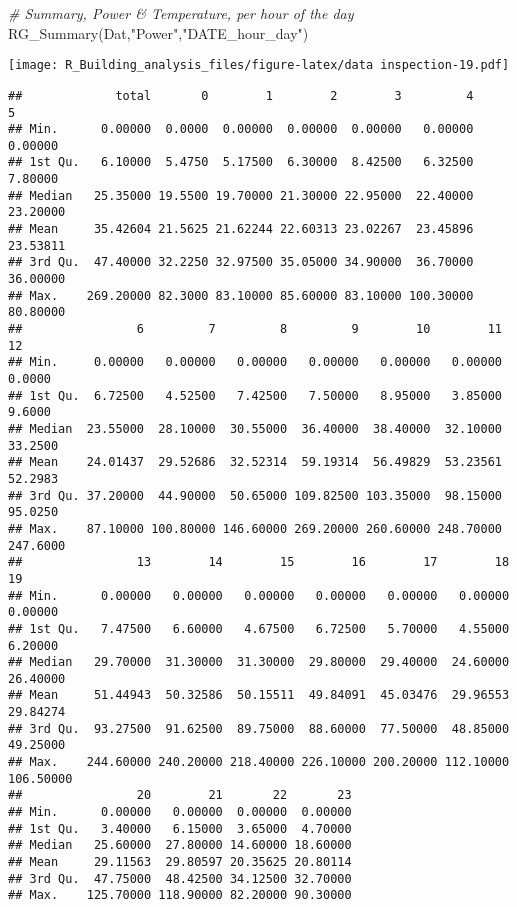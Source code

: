 \documentclass[
]{article}
\newenvironment{Shaded}{\begin{snugshade}}{\end{snugshade}}
\newcommand{\CommentTok}[1]{\textcolor[rgb]{0.56,0.35,0.01}{\textit{#1}}}
\newcommand{\FunctionTok}[1]{\textcolor[rgb]{0.00,0.00,0.00}{#1}}
\newcommand{\NormalTok}[1]{#1}
\newcommand{\StringTok}[1]{\textcolor[rgb]{0.31,0.60,0.02}{#1}}
\begin{document}
\begin{Shaded}
\begin{Highlighting}[]
  \CommentTok{\# Summary, Power \& Temperature, per hour of the day}
  \FunctionTok{RG\_Summary}\NormalTok{(Dat,}\StringTok{"Power"}\NormalTok{,}\StringTok{"DATE\_hour\_day"}\NormalTok{)}
\end{Highlighting}
\end{Shaded}

\texttt{[image: R\_Building\_analysis\_files/figure-latex/data inspection-19.pdf]}

\begin{verbatim}
##             total       0        1        2        3         4        5
## Min.      0.00000  0.0000  0.00000  0.00000  0.00000   0.00000  0.00000
## 1st Qu.   6.10000  5.4750  5.17500  6.30000  8.42500   6.32500  7.80000
## Median   25.35000 19.5500 19.70000 21.30000 22.95000  22.40000 23.20000
## Mean     35.42604 21.5625 21.62244 22.60313 23.02267  23.45896 23.53811
## 3rd Qu.  47.40000 32.2250 32.97500 35.05000 34.90000  36.70000 36.00000
## Max.    269.20000 82.3000 83.10000 85.60000 83.10000 100.30000 80.80000
##                6         7         8         9        10        11       12
## Min.     0.00000   0.00000   0.00000   0.00000   0.00000   0.00000   0.0000
## 1st Qu.  6.72500   4.52500   7.42500   7.50000   8.95000   3.85000   9.6000
## Median  23.55000  28.10000  30.55000  36.40000  38.40000  32.10000  33.2500
## Mean    24.01437  29.52686  32.52314  59.19314  56.49829  53.23561  52.2983
## 3rd Qu. 37.20000  44.90000  50.65000 109.82500 103.35000  98.15000  95.0250
## Max.    87.10000 100.80000 146.60000 269.20000 260.60000 248.70000 247.6000
##                13        14        15        16        17        18        19
## Min.      0.00000   0.00000   0.00000   0.00000   0.00000   0.00000   0.00000
## 1st Qu.   7.47500   6.60000   4.67500   6.72500   5.70000   4.55000   6.20000
## Median   29.70000  31.30000  31.30000  29.80000  29.40000  24.60000  26.40000
## Mean     51.44943  50.32586  50.15511  49.84091  45.03476  29.96553  29.84274
## 3rd Qu.  93.27500  91.62500  89.75000  88.60000  77.50000  48.85000  49.25000
## Max.    244.60000 240.20000 218.40000 226.10000 200.20000 112.10000 106.50000
##                20        21       22       23
## Min.      0.00000   0.00000  0.00000  0.00000
## 1st Qu.   3.40000   6.15000  3.65000  4.70000
## Median   25.60000  27.80000 14.60000 18.60000
## Mean     29.11563  29.80597 20.35625 20.80114
## 3rd Qu.  47.75000  48.42500 34.12500 32.70000
## Max.    125.70000 118.90000 82.20000 90.30000
\end{verbatim}
\end{document}

